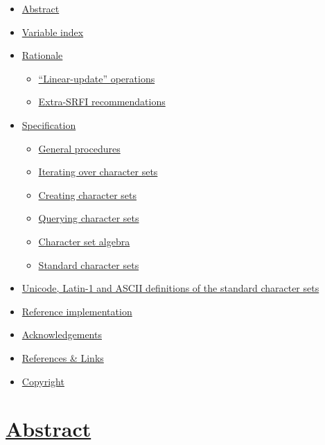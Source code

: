 \begin{itemize}
\tightlist
\item
  \protect\hyperlink{Abstract}{Abstract}
\item
  \protect\hyperlink{VariableIndex}{Variable index}
\item
  \protect\hyperlink{Rationale}{Rationale}

  \begin{itemize}
  \tightlist
  \item
    \protect\hyperlink{LinearUpdateOperations}{``Linear-update''
    operations}
  \item
    \protect\hyperlink{ExtraSRFI}{Extra-SRFI recommendations}
  \end{itemize}
\item
  \protect\hyperlink{Specification}{Specification}

  \begin{itemize}
  \tightlist
  \item
    \protect\hyperlink{GeneralProcs}{General procedures}
  \item
    \protect\hyperlink{Iterating}{Iterating over character sets}
  \item
    \protect\hyperlink{Creating}{Creating character sets}
  \item
    \protect\hyperlink{Querying}{Querying character sets}
  \item
    \protect\hyperlink{Algebra}{Character set algebra}
  \item
    \protect\hyperlink{StandardCharsets}{Standard character sets}
  \end{itemize}
\item
  \protect\hyperlink{StandardCharsetDefs}{Unicode, Latin-1 and ASCII
  definitions of the standard character sets}
\item
  \protect\hyperlink{ReferenceImp}{Reference implementation}
\item
  \protect\hyperlink{Acknowledgements}{Acknowledgements}
\item
  \protect\hyperlink{Links}{References \& Links}
\item
  \protect\hyperlink{Copyright}{Copyright}
\end{itemize}

\section{\texorpdfstring{\href{}{Abstract}}{Abstract}}\label{abstract}

